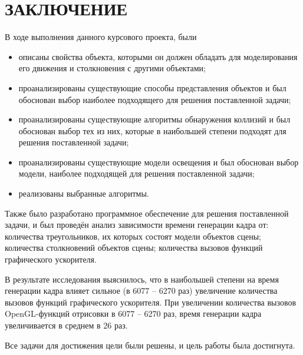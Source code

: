 \section*{ЗАКЛЮЧЕНИЕ}

В ходе выполнения данного курсового проекта, были
\begin{itemize}
    \item описаны свойства объекта, которыми он должен обладать для моделирования его движения и столкновения с другими объектами;
    \item проанализированы существующие способы представления объектов и был обоснован выбор наиболее подходящего для решения поставленной задачи;
    \item проанализированы существующие алгоритмы обнаружения коллизий и был обоснован выбор тех из них, которые в наибольшей степени подходят для решения поставленной задачи;
    \item проанализированы существующие модели освещения и был обоснован выбор модели, наиболее подходящей для решения поставленной задачи;
    \item реализованы выбранные алгоритмы.
\end{itemize}

Также было разработано программное обеспечение для решения поставленной задачи, и был проведён анализ зависимости времени генерации кадра от: количества треугольников, их которых состоят модели объектов сцены; количества столкновений объектов сцены; количества вызовов функций графического ускорителя.

В результате исследования выяснилось, что в наибольшей степени на время генерации кадра влияет сильное (в 6077 -- 6270 раз) увеличение количества вызовов функций графического ускорителя.
При увеличении количества вызовов OpenGL-функций отрисовки в 6077 -- 6270 раз, время генерации кадра увеличивается в среднем в 26 раз.

Все задачи для достижения цели были решены, и цель работы была достигнута.
